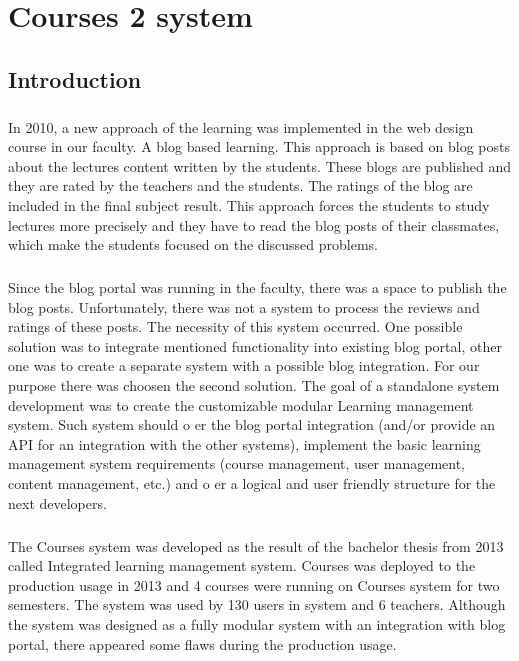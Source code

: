 \chapter{Courses 2 system}

\label{kap:courses} %

\section{Introduction}
\paragraph{}
In 2010, a new approach of the learning was implemented in the web design course in our faculty. A blog based learning. This approach is based on blog posts about the lectures content written by the students. These blogs are published and they are rated by the teachers and the students. The ratings of the blog are included in the final subject result. This approach forces the students to study lectures more precisely and they have to read the blog posts of their classmates, which make the students focused on the discussed problems.\cite{culik}

\paragraph{}
Since the blog portal \cite{rejda} was running in the faculty, there was a space to publish the blog posts. Unfortunately, there was not a system to process the reviews and ratings of these posts. The necessity of this system occurred. One possible solution was to integrate mentioned functionality into existing blog portal, other one was to create a separate system with a possible blog integration. For our purpose there was choosen the second solution. The goal of a standalone system development was to create the customizable modular Learning management system. Such system should o er the blog portal integration (and/or provide an API for an integration with the other systems), implement the basic learning management system requirements (course management, user management, content management, etc.) and o er a logical and user friendly structure for the next developers.

\paragraph{}
The Courses system was developed as the result of the bachelor thesis from 2013 called Integrated learning management system.\cite{culik} Courses was deployed to the production usage in 2013 and 4 courses were running on Courses system for two semesters. The system was used by 130 users in system and 6 teachers. Although the system was designed as a fully modular system with an integration with blog portal, there appeared some flaws during the production usage.

